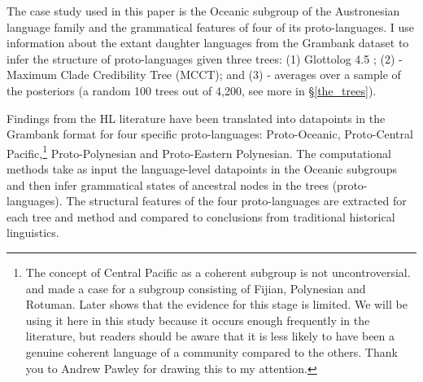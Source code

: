 \documentclass[12pt,letterpaper]{article}
\begin{document}


The case study used in this paper is the Oceanic subgroup of the Austronesian language family and the grammatical features of four of its proto-languages. I use information about the extant daughter languages from the Grambank dataset \citep{grambank_release} to infer the structure of proto-languages given three trees: (1) Glottolog 4.5 \citep{glottolog4_5}; (2) \citet{grayetal_2009} - Maximum Clade Credibility Tree (MCCT); and (3) \citet{grayetal_2009} - averages over a sample of the posteriors (a random 100 trees out of 4,200, see more in §\ref{the_trees}). 

Findings from the HL literature have been translated into datapoints in the Grambank format for four specific proto-languages: Proto-Oceanic, Proto-Central Pacific,\footnote{The concept of Central Pacific as a coherent subgroup is not uncontroversial. \citet{grace1958position} and \citet{pawley1972internal} made a case for a subgroup consisting of Fijian, Polynesian and Rotuman. Later \citet{geraghty1996} shows that the evidence for this stage is limited. We will be using it here in this study because it occurs enough frequently in the literature, but readers should be aware that it is less likely to have been a genuine coherent language of a community compared to the others. Thank you to Andrew Pawley for drawing this to my attention.} Proto-Polynesian and Proto-Eastern Polynesian. The computational methods take as input the language-level datapoints in the Oceanic subgroups and then infer grammatical states of ancestral nodes in the trees (proto-languages). The structural features of the four proto-languages are extracted for each tree and method and compared to conclusions from traditional historical linguistics. 
\end{document}
